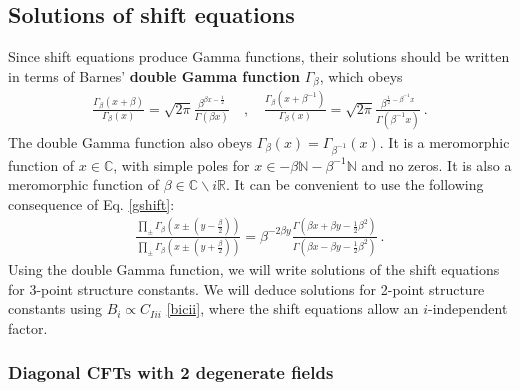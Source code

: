 \documentclass[12pt, a4paper]{article}
\newcommand{\myindex}[1]{\textbf{\boldmath #1}}
\theoremstyle{break}
\begin{document}
\subsection{Solutions of shift equations}\label{sec:essc}

Since shift equations produce Gamma functions, their solutions should be written in terms of Barnes' \myindex{double Gamma function} $\Gamma_\beta$, which obeys
\begin{align}
\frac{\Gamma_\beta(x+\beta)}{\Gamma_\beta(x)} = \sqrt{2\pi}\frac{\beta^{\beta x-\frac12}}{\Gamma(\beta x)}
\quad , \quad 
\frac{\Gamma_\beta(x+\beta^{-1})}{\Gamma_\beta(x)} = \sqrt{2\pi}\frac{\beta^{\frac12-\beta^{-1}x}}{\Gamma(\beta^{-1}x)} \ .
\label{gshift}
\end{align}
The double Gamma function also obeys $\Gamma_\beta(x)= \Gamma_{\beta^{-1}}(x)$. It is a meromorphic function of $x\in\mathbb{C}$, with simple poles for $x\in -\beta\mathbb{N}-\beta^{-1}\mathbb{N}$ and no zeros. It is also a meromorphic function of $\beta\in \mathbb{C}\backslash i\mathbb{R}$. It can be convenient to use the following consequence of Eq. \eqref{gshift}:
\begin{align}
 \frac{\prod_\pm \Gamma_\beta\left(x \pm (y-\frac{\beta}{2})\right)}{\prod_\pm \Gamma_\beta\left(x \pm (y+\frac{\beta}{2})\right)} = \beta^{-2\beta y}\frac{\Gamma\left(\beta x+\beta y - \frac12 \beta^2\right)}{\Gamma\left(\beta x-\beta y -\frac12 \beta^2\right)}\ . 
\end{align}
Using the double Gamma function, we will write solutions of the shift equations for 3-point structure constants. We will deduce solutions for 2-point structure constants using $B_i\propto C_{Iii}$ \eqref{bicii}, where the shift equations allow an $i$-independent factor. 

\subsubsection{Diagonal CFTs with 2 degenerate fields}\label{sec:dtdf}
\end{document}
